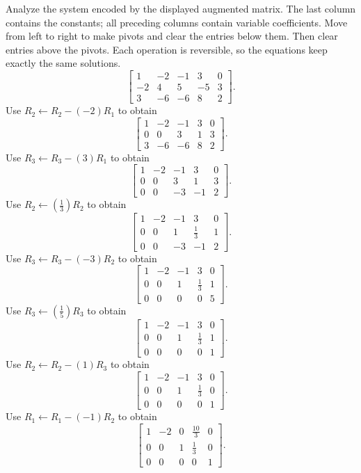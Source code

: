 \goal Analyze the system encoded by the displayed augmented matrix. The last column contains the constants; all preceding columns contain variable coefficients.
\idea Move from left to right to make pivots and clear the entries below them. Then clear entries above the pivots. Each operation is reversible, so the equations keep exactly the same solutions.
\[ \left[\begin{array}{rrrr|r}1&-2&-1&3&0\\-2&4&5&-5&3\\3&-6&-6&8&2\end{array}\right].\]
Use $R_{2}\leftarrow R_{2}-(-2)R_{1}$ to obtain
\[ \left[\begin{array}{rrrr|r}1&-2&-1&3&0\\0&0&3&1&3\\3&-6&-6&8&2\end{array}\right].\]
Use $R_{3}\leftarrow R_{3}-(3)R_{1}$ to obtain
\[ \left[\begin{array}{rrrr|r}1&-2&-1&3&0\\0&0&3&1&3\\0&0&-3&-1&2\end{array}\right].\]
Use $R_{2}\leftarrow(\frac{1}{3})R_{2}$ to obtain
\[ \left[\begin{array}{rrrr|r}1&-2&-1&3&0\\0&0&1&\frac{1}{3}&1\\0&0&-3&-1&2\end{array}\right].\]
Use $R_{3}\leftarrow R_{3}-(-3)R_{2}$ to obtain
\[ \left[\begin{array}{rrrr|r}1&-2&-1&3&0\\0&0&1&\frac{1}{3}&1\\0&0&0&0&5\end{array}\right].\]
Use $R_{3}\leftarrow(\frac{1}{5})R_{3}$ to obtain
\[ \left[\begin{array}{rrrr|r}1&-2&-1&3&0\\0&0&1&\frac{1}{3}&1\\0&0&0&0&1\end{array}\right].\]
Use $R_{2}\leftarrow R_{2}-(1)R_{3}$ to obtain
\[ \left[\begin{array}{rrrr|r}1&-2&-1&3&0\\0&0&1&\frac{1}{3}&0\\0&0&0&0&1\end{array}\right].\]
Use $R_{1}\leftarrow R_{1}-(-1)R_{2}$ to obtain
\[ \left[\begin{array}{rrrr|r}1&-2&0&\frac{10}{3}&0\\0&0&1&\frac{1}{3}&0\\0&0&0&0&1\end{array}\right].\]

